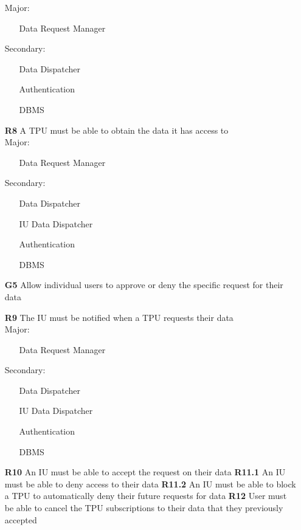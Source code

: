 \begin{itemize}
Major:
\begin{itemize}
\item[\textbullet]Data Request Manager 
\end{itemize}
Secondary:
\begin{itemize}
\item[\textbullet]Data Dispatcher
\item[\textbullet]Authentication
\item[\textbullet]DBMS
\end{itemize}


\subitem \textbf{R8} A TPU must be able to obtain the data it has access to \\

Major:
\begin{itemize}
\item[\textbullet]Data Request Manager 
\end{itemize}
Secondary:
\begin{itemize}
\item[\textbullet]Data Dispatcher
\item[\textbullet]IU Data Dispatcher
\item[\textbullet]Authentication
\item[\textbullet]DBMS
\end{itemize}

\item [\textbf{G5}] Allow individual users to approve or deny the specific request for their data

\subitem \textbf{R9} The IU must be notified when a TPU requests their data\\

Major:
\begin{itemize}
\item[\textbullet]Data Request Manager 
\end{itemize}
Secondary:
\begin{itemize}
\item[\textbullet]Data Dispatcher
\item[\textbullet]IU Data Dispatcher
\item[\textbullet]Authentication
\item[\textbullet]DBMS
\end{itemize}
\subitem \textbf{R10} An IU must be able to accept the request on their data
\subitem \textbf{R11.1} An IU must be able to deny access to their data
\subitem \textbf{R11.2} An IU must be able to block a TPU to automatically deny their future requests for data
\subitem \textbf{R12} User must be able to cancel the TPU subscriptions to their data that they previously accepted\\


\end{itemize}
